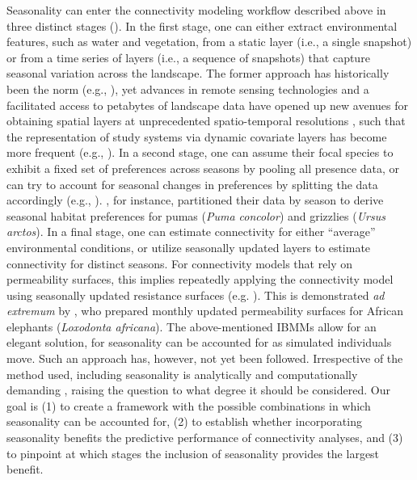 \documentclass[abstract=on,10pt,a4paper,bibliography=totocnumbered]{article}
\begin{document}
Seasonality can enter the connectivity modeling workflow described above in
three distinct stages (). In the first stage, one can
either extract environmental features, such as water and vegetation, from a
static layer (i.e., a single snapshot) or from a time series of layers (i.e., a
sequence of snapshots) that capture seasonal variation across the landscape. The
former approach has historically been the norm (e.g., \citealp{Elliot.2014,
Brennan.2020}), yet advances in remote sensing technologies and a facilitated
access to petabytes of landscape data have opened up new avenues for obtaining
spatial layers at unprecedented spatio-temporal resolutions \citep{Toth.2016,
Rumiano.2020}, such that the representation of study systems via dynamic
covariate layers has become more frequent (e.g., \citealp{Osipova.2019,
Kaszta.2021}). In a second stage, one can assume their focal species to exhibit
a fixed set of preferences across seasons by pooling all presence data, or can
try to account for seasonal changes in preferences by splitting the data
accordingly (e.g., \citealp{Fortin.2005, Manly.2007, Cushman.2010,
Zeller.2020}). \cite{Chetkiewicz.2009}, for instance, partitioned their data by
season to derive seasonal habitat preferences for pumas (\textit{Puma concolor})
and grizzlies (\textit{Ursus arctos}). In a final stage, one can estimate
connectivity for either ``average'' environmental conditions, or utilize
seasonally updated layers to estimate connectivity for distinct seasons. For
connectivity models that rely on permeability surfaces, this implies repeatedly
applying the connectivity model using seasonally updated resistance surfaces
(e.g. \citealp{Osipova.2019, Zeller.2020, Kaszta.2021, Ciudad.2021}). This is
demonstrated \textit{ad extremum} by \citet{Kaszta.2021}, who prepared monthly
updated permeability surfaces for African elephants (\textit{Loxodonta
africana}). The above-mentioned IBMMs allow for an elegant solution, for
seasonality can be accounted for as simulated individuals move. Such an approach
has, however, not yet been followed. Irrespective of the method used, including
seasonality is analytically and computationally  demanding
\citep{Bishop-Taylor.2018}, raising the question to what degree it should be
considered. Our goal is (1) to create a framework with the possible combinations
in which seasonality can be accounted for, (2) to establish whether
incorporating seasonality benefits the predictive performance of connectivity
analyses, and (3) to pinpoint at which stages the inclusion of seasonality
provides the largest benefit.
\end{document}
